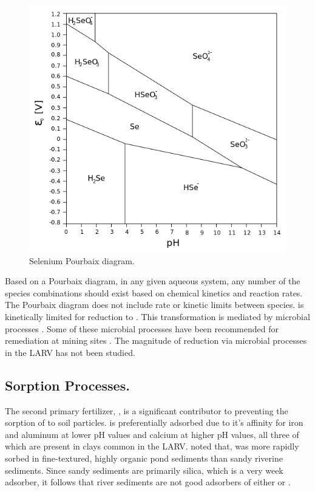 \begin{linenumbers}[1]
\begin{figure}[!htbp]
	\centering
	\includegraphics[scale=0.75]{"Figures/SeleniumPourbaix"}
	\caption[Selenium Pourbaix diagram.]{Selenium Pourbaix diagram.}
	\label{fig:Pourbaix}
\end{figure}

Based on a Pourbaix diagram, in any given aqueous system, any number of the species combinations should exist based on chemical kinetics and reaction rates.  The Pourbaix diagram does not include rate or kinetic limits between species.  \selenate is kinetically limited for reduction to \selenite.  This transformation is mediated by microbial processes \parencite{Lalvani2004}.  Some of these microbial processes have been recommended for \Se remediation at mining sites \parencite{MSE2001}.  The magnitude of \selenate reduction via microbial processes in the LARV has not been studied.

\subsection*{Sorption Processes.}
The second primary fertilizer, \phosphate, is a significant contributor to preventing the sorption of \selenite to soil particles.  \phosphate is preferentially adsorbed due to it's affinity for iron and aluminum at lower pH values and calcium at higher pH values, all three of which are present in clays common in the LARV.  \textcite{Besser1989} noted that, \Se was more rapidly sorbed in fine-textured, highly organic pond sediments than sandy riverine sediments.  Since sandy sediments are primarily silica, which is a very week adsorber, it follows that river sediments are not good adsorbers of either \phosphate or \selenite \parencite{Oram2008}.


\end{linenumbers}

